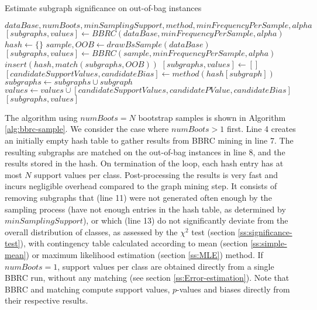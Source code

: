 \documentclass{article}
\begin{document}
\renewcommand{\algorithmicrequire}{\textbf{Input:}}
\renewcommand{\algorithmicensure}{\textbf{Output:}}
\begin{algorithm}[t]
  \caption{Estimate subgraph significance on out-of-bag instances}
  \label{alg:bbrc-sample}
  {\small \begin{algorithmic}[1]
  \Require $dataBase, numBoots, minSamplingSupport, method, minFrequencyPerSample, alpha$
    \State $[subgraphs, values] \gets BBRC(dataBase, minFrequencyPerSample, alpha)$
  \Else
    \State $hash \gets \{\}$
     
      \State $sample,OOB \gets drawBsSample(dataBase)$
      \State $[subgraphs, values] \gets BBRC(sample, minFrequencyPerSample, alpha)$
      \State $insert(hash,match(subgraphs,OOB))$
    \EndFor
    \State $[subgraphs, values] \gets []$
        \State $[candidateSupportValues, candidateBias] \gets method(hash[subgraph])$
          \State $subgraphs \gets subgraphs \cup subgraph$
          \State $values \gets values \cup [candidateSupportValues, candidatePValue, candidateBias]$
        \EndIf
      \EndIf
    \EndFor
  \EndIf
  \Ensure $[subgraphs, values]$
\end{algorithmic}}
\end{algorithm}
The algorithm using $numBoots=N$ bootstrap samples is shown in Algorithm
\ref{alg:bbrc-sample}.  We consider the case where $numBoots>1$ first.  Line 4
creates an initially empty hash table to gather results from BBRC mining in
line 7. The resulting subgraphs are matched on the out-of-bag instances in line
8, and the results stored in the hash. On termination of the loop, each hash
entry has at most $N$ support values per class.  Post-processing the results is
very fast and incurs negligible overhead compared to the graph mining step. It
consists of removing subgraphs that (line 11) were not generated often enough
by the sampling process (have not enough entries in the hash table, as
determined by $minSamplingSupport$), or which (line 13) do not significantly
deviate from the overall distribution of classes, as assessed by the $\chi^2$
test (section \ref{ss:significance-test}), with contingency table calculated
according to mean (section \ref{ss:simple-mean}) or maximum likelihood
estimation (section \ref{ss:MLE}) method. If $numBoots=1$, support values per
class are obtained directly from a single BBRC run, without any matching (see
section \ref{ss:Error-estimation}). Note that BBRC and matching compute support
values, $p$-values and biases directly from their respective results.
\end{document}
